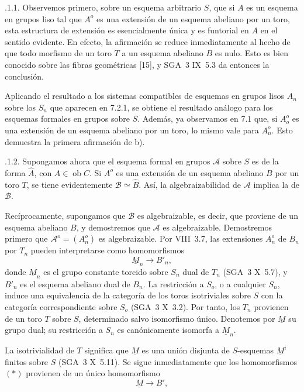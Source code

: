 \medskip
{}.1.1. Observemos primero, sobre un esquema arbitrario $S$, que si
$A$ es un esquema en grupos liso tal que $A^o$ es una extensión de un
esquema abeliano por un toro, esta estructura de extensión es
esencialmente única y es funtorial en $A$ en el sentido evidente. En
efecto, la afirmación se reduce inmediatamente al hecho de que todo
morfismo de un toro $T$ a un esquema abeliano $B$ es nulo. Esto es bien
conocido sobre las fibras geométricas [15], y SGA~3 IX~5.3 da entonces
la conclusión.


Aplicando el resultado a los sistemas compatibles de esquemas en grupos
lisos $A_n$ sobre los $S_n$ que aparecen en 7.2.1, se obtiene el
resultado análogo para los esquemas formales en grupos sobre $S$.
Además, ya observamos en 7.1 que, si $A_o^o$ es una extensión de un
esquema abeliano por un toro, lo mismo vale para $A_n^o$. Esto demuestra
la primera afirmación de b).

\medskip
{}.1.2. Supongamos ahora que el esquema formal en grupos $\mathcal A$
sobre $S$ es de la forma $\widehat A$, con
$A\in\operatorname{ob}C$. Si $A^o$ es una extensión de un esquema
abeliano $B$ por un toro $T$, se tiene evidentemente
$\mathcal B\simeq\widehat B$. Así, la algebraizabilidad de $\mathcal A$
implica la de $\mathcal B$.

Recíprocamente, supongamos que $\mathcal B$ es algebraizable, es decir,
que proviene de un esquema abeliano $B$, y demostremos que $\mathcal A$
es algebraizable. Demostremos primero que
$\mathcal A^o=(A_n^o)$ es algebraizable. Por VIII~3.7, las extensiones
$A_n^o$ de $B_n$ por $T_n$ pueden interpretarse como homomorfismos
\begin{equation}\tag{*}
 \underline M_n\longrightarrow B'_n,
\end{equation}
donde $\underline M_n$ es el grupo constante torcido sobre $S_n$ dual
de $T_n$ (SGA~3 X~5.7), y $B'_n$ es el esquema abeliano dual de $B_n$.
La restricción a $S_o$, o a cualquier $S_n$, induce una equivalencia de
la categoría de los toros isotriviales sobre $S$ con la categoría
correspondiente sobre $S_o$ (SGA~3 X~3.2). Por tanto, los $T_n$
provienen de un toro $T$ sobre $S$, determinado salvo isomorfismo único.
Denotemos por $\underline M$ su grupo dual; su restricción a $S_n$ es
canónicamente isomorfa a $\underline M_n$.

La isotrivialidad de $T$ significa que $\underline M$ es una unión
disjunta de $S$-esquemas $\underline M^i$ finitos sobre $S$
(SGA~3 X~5.11). Se sigue inmediatamente que los homomorfismos $(*)$
provienen de un único homomorfismo
\begin{equation}\tag{**}
 \underline M\longrightarrow B',
\end{equation}

